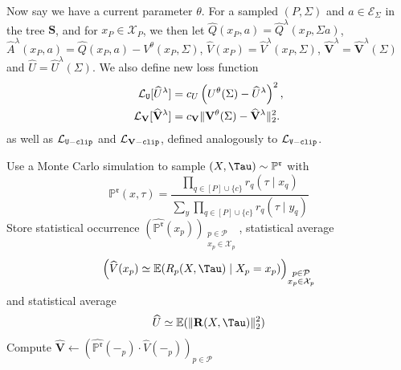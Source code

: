 \documentclass[12pt, a4paper]{article}
\begin{document}
Now say we have a current parameter $\theta$.
For a sampled $(P, \Sigma)$ and $a \in \mathcal{E}_\Sigma$ in the tree $\mathbf{S}$, and for $x_P \in \mathcal{X}_P$, we then let $\widehat{Q}(x_P, a) = \widehat{Q}^\lambda(x_P, \Sigma a)$, $\widehat{A}^\lambda(x_P, a) = \widehat{Q}(x_P, a) - V^\theta(x_P, \Sigma)$, $\widehat{V}(x_P) = \widehat{V}^\lambda(x_P, \Sigma)$, $\widehat{\mathbf{V}}^\lambda=\widehat{\mathbf{V}}^\lambda(\Sigma)$ and $\widehat{U} = \widehat{U}^\lambda(\Sigma)$.
We also define new loss function
\begin{equation}\label{eq:branched-u-loss}
\begin{aligned}
    \mathcal L_{\tt U}[\widehat{U}^\lambda]
    &= c_U\left(U^\theta(\Sigma) - \widehat{U}^\lambda\right)^2,\\
    \mathcal L_{\mathbf V}[\widehat{\mathbf{V}}^\lambda]
    &= c_{\mathbf V}\|\mathbf{V}^\theta(\Sigma)-\widehat{\mathbf{V}}^\lambda\|_2^2.
\end{aligned}
\end{equation}
as well as $\mathcal L_{\tt U-clip}$ and $\mathcal L_{\mathbf{V}\tt-clip}$, defined analogously to $\mathcal L_{\tt V-clip}$.

\begin{algorithm}[H]
\caption{$(\widehat{\mathbb{P}},\widehat{V},\widehat{\mathbf{V}}, \widehat{U})\gets$~\texttt{PreTerminalMomentMC}$(\mathfrak r)$}
\label{alg:mc-preterminal-moments}
\DontPrintSemicolon
{}
  Use a Monte Carlo simulation to sample $(X,\Tau) \sim \mathbb{P}^{\mathfrak r}$ with
  \[
    \mathbb{P}^{\mathfrak r}(x,\tau)
    =
    \frac{\prod_{q \in [P] \cup \{c\}} r_q(\tau \mid x_q)}
         {\sum_y \prod_{q \in [P] \cup \{c\}} r_q(\tau \mid y_q)}
  \]\;
  Store statistical occurrence $(\widehat{\mathbb{P}^{\mathfrak r}}(x_p))_{\substack{p \in \mathcal{P} \\ x_p \in \mathcal{X}_p}}$, statistical average
  \[
    \left(\widehat{V}(x_p) \simeq \mathbb{E}(R_p(X,\Tau) \mid X_p = x_p)\right)_{\substack{p \in \mathcal{P} \\ x_p \in \mathcal{X}_p}}
  \]
  and statistical average
  \[
    \widehat{U} \simeq \mathbb{E}(\|\mathbf{R}(X,\Tau)\|_2^2)
  \]\;
  Compute $\widehat{\mathbf{V}} \gets \left(\widehat{\mathbb{P}^{\mathfrak r}}(-_p) \cdot \widehat{V}(-_p)\right)_{p \in \mathcal{P}}$\;
\end{algorithm}
\end{document}
